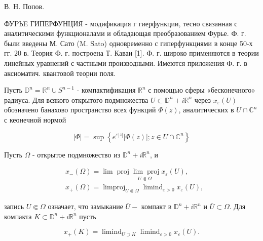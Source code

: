 \documentclass[10pt]{article}
\begin{document}
В. H. Попов.



ФУPЬE ГИПЕРФУНЦИЯ - модификация г гиерфункции, тесно связанная с аналитическими функционалами и обладающая преобразованием Фурье. Ф. г. были введены М. Сато (M. Sato) одновременно с гиперфункциями в конце 50-х гг. 20 в. Теория Ф. г. построена Т. Каваи [1]. Ф. г. широко применяются в теории линейных уравнений с частными производными. Имеются приложения Ф. г. в аксиоматич. квантовой теории поля.



Пусть $\mathbb{D}^{n}=\mathbb{R}^{n} \cup S^{n-1}$ - компактификация $\mathbb{R}^{n}$ с помощью сферы «бесконечного» радиуса. Для всякого открытого подмножества $U \subset \mathbb{D}^{n}+i \mathbb{R}^{n}$ через $x_{\varepsilon}(U)$ обозначено банахово пространство всех функций $\Phi(z)$, аналитических в $U \cap \mathbb{C}^{n}$ с кеонечной нормой



\[

|\Phi|=\sup \left\{e^{\varepsilon|z|}|\Phi(z)| ; z \in U \cap \mathbb{C}^{n}\right\}

\]



Пусть $\Omega$ - открытое подмножество из $\mathbb{D}^{n}+i \mathbb{R}^{n}$, и



\[

\begin{aligned}

& x_{-}(\Omega)=\underset{U \Subset \Omega}{\lim \operatorname{proj} \lim \operatorname{proj} x_{\varepsilon}(U),} \\

& x_{+}(\Omega)=\operatorname{limproj}_{U \Subset \Omega} \operatorname{limind}_{\varepsilon>0} x_{\varepsilon}(U),

\end{aligned}

\]



запись $U \Subset \Omega$ означает, что замыкание $\bar{U}-$ компакт в $\mathbb{D}^{n}+i \mathbb{R}^{n}$ и $\bar{U} \subset \Omega$. Для компакта $K \subset \mathbb{D}^{n}+i \mathbb{R}^{n}$ пусть



\[

x_{+}(K)=\operatorname{limind}_{U \supset K} \operatorname{limind}_{\varepsilon>0} x_{\varepsilon}(U) .

\]
\end{document}
